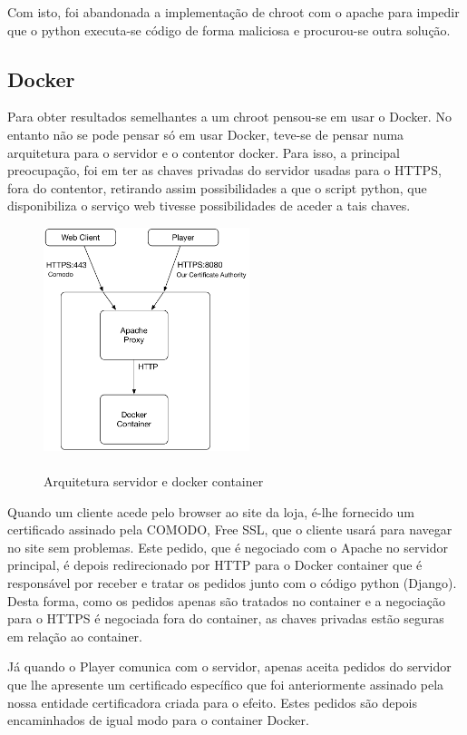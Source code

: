 \documentclass[pdftex,12pt,a4paper]{report}
\begin{document}
Com isto, foi abandonada a implementação de chroot com o apache para impedir que o python executa-se código de forma maliciosa e procurou-se outra solução.

\newpage
\subsection{Docker}
Para obter resultados semelhantes a um chroot pensou-se em usar o Docker. No entanto não se pode pensar só em usar Docker, teve-se de pensar numa arquitetura para o servidor e o contentor docker. Para isso, a principal preocupação, foi em ter as chaves privadas do servidor usadas para o HTTPS, fora do contentor, retirando assim possibilidades a que o script python, que disponibiliza o serviço web tivesse possibilidades de aceder a tais chaves.

\begin{figure}[!htb]
\center
 \includegraphics[width=60mm,scale=1]{docker.pdf}
 \caption{\\Arquitetura servidor e docker container}
 \label{fig:docker_c}
\end{figure}

Quando um cliente acede pelo browser ao site da loja, é-lhe fornecido um certificado assinado pela COMODO, Free SSL, que o cliente usará para navegar no site sem problemas. Este pedido, que é negociado com o Apache no servidor principal, é depois redirecionado por HTTP para o Docker container que é responsável por receber e tratar os pedidos junto com o código python (Django). Desta forma, como os pedidos apenas são tratados no container e a negociação para o HTTPS é negociada fora do container, as chaves privadas estão seguras em relação ao container.

Já quando o Player comunica com o servidor, apenas aceita pedidos do servidor que lhe apresente um certificado específico que foi anteriormente assinado pela nossa entidade certificadora criada para o efeito. Estes pedidos são depois encaminhados de igual modo para o container Docker.
\end{document}

